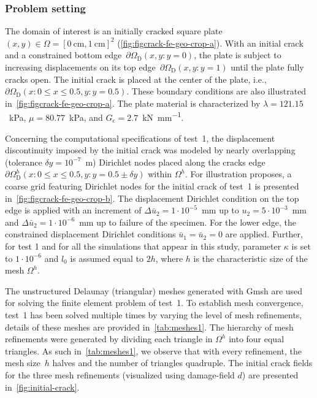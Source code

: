 \documentclass{report}
\newcommand{\bnd}{N_{\text{DOF}}}
\newcommand{\bgc}{G_{\text{c}}}
\begin{document}
\subsubsection{Problem setting \label{sec:2D-problem-statement}}
%
The domain of interest is an initially cracked square plate $(x,y) \in \Omega =[0~\si{\centi\meter},1~\si{\centi\meter}]^2$ (\cref{fig:figcrack-fe-geo-crop-a}). With an initial crack and a constrained bottom edge~$\partial\Omega_{\text{D}}(x,y:y=0)$, the plate  is subject to increasing displacements on its top edge~$\partial\Omega_{\text{D}}(x,y:y=1)$ until the plate fully cracks open.
The initial crack is placed at the center of the plate, i.e., $\partial\Omega_{\text{D}}(x:0 \le x \le 0.5,y:y=0.5)$. These boundary conditions are also illustrated in~\cref{fig:figcrack-fe-geo-crop-a}.
The plate material is characterized by $\lambda=121.15$~\si{\kilo\pascal}, $\mu=80.77$~\si{\kilo\pascal}, and $\bgc=2.7$~\si{\kilo\newton\per\milli\meter}.

Concerning  the  computational specifications of test~1,  the displacement discontinuity  imposed by the initial crack was modeled by nearly overlapping (tolerance $\delta y=10^{-7}$~\si{\meter}) Dirichlet nodes  placed along the cracks edge $\partial\Omega^h_{\text{D}}(x:0 \le x \le 0.5,y:y=0.5\pm\delta y)$ within $\Omega^h$. For illustration proposes,  a coarse grid featuring Dirichlet nodes for the initial crack of test~1 is presented in~\cref{fig:figcrack-fe-geo-crop-b}.
The displacement Dirichlet condition on the top edge is applied with an increment of $\Delta\bar{u}_{2} =1\cdot10^{-5}$~\si{\milli\meter} up to $u_2=5\cdot10^{-3}$~\si{\milli\meter} and $\Delta\bar{u}_{2} =1\cdot10^{-6}$~\si{\milli\meter} up to failure of the specimen. For the lower edge, the constrained displacement Dirichlet conditions $\bar{u}_{1}=\bar{u}_{2}=0$ are applied. Further, for test 1 and for all the simulations that appear in this study, parameter $\kappa$ is set to $1\cdot10^{-6}$ and $l_0$ is assumed equal to $2h$, where $h$ is the characteristic size of the mesh $\Omega^h$.  

The unstructured Delaunay (triangular) meshes generated with Gmsh are used for solving the finite element problem of test~1. To establish mesh convergence, test~1 has been solved multiple times by varying the level of mesh refinements, details of these meshes are provided in~\cref{tab:meshes1}. The hierarchy of mesh refinements were generated by dividing each triangle in $\Omega^h$ into four equal triangles. As such in~\cref{tab:meshes1}, we observe that with every refinement, the mesh size~$h$ halves and the number of triangles quadruple. The initial crack fields for the three mesh refinements (visualized using damage-field $d$) are presented in~\cref{fig:initial-crack}.    %
\end{document}
